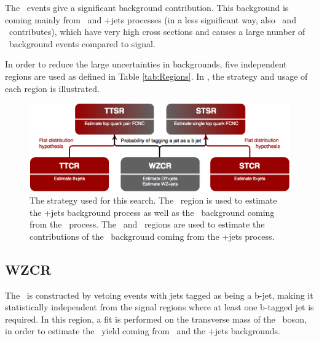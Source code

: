 The \NPL\  events give a significant background contribution. This background is coming mainly from \DY\ and \ttbar+jets processes (in a less significant way, also \WW\ and \tWZ\ contributes), which have very high cross sections and causes a large number of \NPL\  background events compared to signal.

In order to reduce the large uncertainties in backgrounds, five independent regions are used as defined in Table  \ref{tab:Regions}. In , the strategy and usage of each region is illustrated.
\begin{figure}
	\centering
	\includegraphics[width=1.\linewidth]{5_EventSelection/Figures/regions}
	\caption{The strategy used for this search. The \WZCR\ region is used to estimate the \WZ+jets background process as well as the \NPL\ background coming from the \DY\ process. The \TTCR\ and \STCR\ regions are used to estimate the contributions of the \NPL\ background coming from the \ttbar+jets process.}
	\label{fig:regions}
\end{figure}


\subsection{WZCR}
The \WZCR\ is constructed by vetoing events with jets tagged as being a b-jet, making it statistically independent from the signal regions where at least one b-tagged jet is required. In this region, a fit is performed on the transverse mass of the \PW\ boson, in order to estimate the \NPL\ yield coming from \DY\ and the \WZ+jets backgrounds. 

